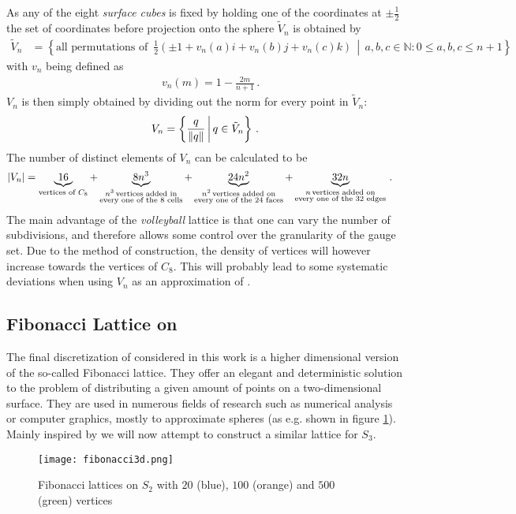 As any of the eight \emph{surface cubes} is fixed by holding one of the coordinates at $\pm \frac{1}{2}$ the set of coordinates before projection onto the sphere $\tilde{V}_n$ is obtained by
\begin{align*}
 \tilde{V}_n & = \left\{ \textrm{all permutations of }  \, \frac{1}{2} \left( \pm 1 + v_n(a) i + v_n(b) j + v_n(c) k \right)  \, \middle| \, a,b,c \in \mathbb{N}: 0 \le a,b,c \le n+1 \right\}
\end{align*}
with $v_n$ being defined as
\begin{align*}
 \quad v_n(m)  =  1-\frac{2m}{n+1} \, \textrm{.}
\end{align*}
$V_n$ is then simply obtained by dividing out the norm for every point in $\tilde{V}_n$:
\begin{align*}
 V_n = \left\{\frac{q}{\norm{q}} \, \middle| \,  q \in \tilde{V}_n \right\} \, \textrm{.}
\end{align*}
The number of distinct elements of $V_n$ can be calculated to be
\begin{align*}
 \abs{V_n} & = \underbrace{16}_{\substack{ \textrm{vertices of } C_8
 }} + \underbrace{8 n^3}_{\substack{n^3 \, \textrm{vertices added in} \\ \textrm{every one of the 8 cells}}} + \underbrace{24 n^2}_{\substack{n^2 \, \textrm{vertices added on} \\ \textrm{every one of the 24 faces}}} + \underbrace{32 n}_{\substack{n \, \textrm{vertices added on} \\ \textrm{every one of the 32 edges}}} \, \textrm{.}
\end{align*}
The main advantage of the \emph{volleyball} lattice is that one can vary the number of subdivisions, and therefore allows some control over the granularity of the gauge set. Due to the method of construction, the density of vertices will however increase towards the vertices of $C_8$. This will probably lead to some systematic deviations when using $V_n$ as an approximation of \SUTwo.

\subsection{Fibonacci Lattice on \SUTwo}

The final discretization of \SUTwo considered in this work is a higher dimensional version of the so-called Fibonacci lattice. They offer an elegant and deterministic solution to the problem of distributing a given amount of points on a two-dimensional surface. They are used in numerous fields of research such as numerical analysis or computer graphics, mostly to approximate spheres (as e.g. shown in figure \ref{fig:fibonacciPic}). Mainly inspired by \cite{stack:fibonacci} we will now attempt to construct a similar lattice for $S_3$.\\
\begin{figure}
 \centering
 \texttt{[image: fibonacci3d.png]}
 \caption{Fibonacci lattices on $S_2$ with $20$ (blue), $100$ (orange) and $500$ (green) vertices}
 \label{fig:fibonacciPic}
\end{figure}

